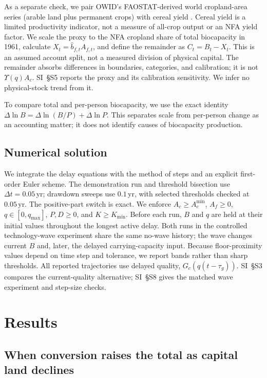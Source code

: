 \documentclass[preprint,12pt,authoryear]{elsarticle}
\newcommand{\Acmin}{A_c^{\min}}
\begin{document}
As a separate check, we pair OWID's FAOSTAT-derived world cropland-area series (arable land plus permanent crops) with cereal yield \citep{OWIDCereal2026,OWIDCropland2026}. Cereal yield is a limited productivity indicator, not a measure of all-crop output or an NFA yield factor. We scale the proxy to the NFA cropland share of total biocapacity in 1961, calculate $X_t=\hat b_{f,t}A_{f,t}$, and define the remainder as $C_t=B_t-X_t$. This is an assumed account split, not a measured division of physical capital. The remainder absorbs differences in boundaries, categories, and calibration; it is not $\Upsilon(q)A_c$. SI~\S S5 reports the proxy and its calibration sensitivity. We infer no physical-stock trend from it.

To compare total and per-person biocapacity, we use the exact identity $\Delta\ln B=\Delta\ln(B/P)+\Delta\ln P$. This separates scale from per-person change as an accounting matter; it does not identify causes of biocapacity production.

\subsection{Numerical solution}\label{sec:numerics}

We integrate the delay equations with the method of steps and an explicit first-order Euler scheme. The demonstration run and threshold bisection use $\Delta t=0.05$\,yr; drawdown sweeps use $0.1$\,yr, with selected thresholds checked at $0.05$\,yr. The positive-part switch is exact. We enforce $A_c\ge\Acmin$, $A_f\ge0$, $q\in[0,q_{\max}]$, $P,D\ge0$, and $K\ge K_{\min}$. Before each run, $B$ and $q$ are held at their initial values throughout the longest active delay. Both runs in the controlled technology-wave experiment share the same no-wave history; the wave changes current $B$ and, later, the delayed carrying-capacity input. Because floor-proximity values depend on time step and tolerance, we report bands rather than sharp thresholds. All reported trajectories use delayed quality, $G_c(q(t-\tau_g))$. SI~\S S3 compares the current-quality alternative; SI~\S S8 gives the matched wave experiment and step-size checks.
\section{Results}\label{sec:results}

\subsection{When conversion raises the total as capital land declines}\label{sec:mask}
\end{document}
